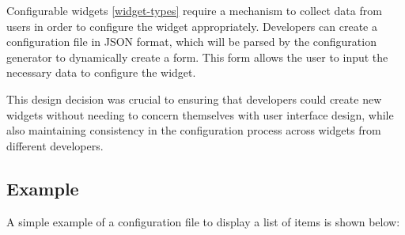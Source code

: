 Configurable widgets \ref{widget-types} require a mechanism to collect data from users in order to configure the widget appropriately. 
Developers can create a configuration file in JSON format, which will be parsed by the configuration generator to dynamically create a form. 
This form allows the user to input the necessary data to configure the widget.

This design decision was crucial to ensuring that developers could create new widgets without needing to concern themselves with user interface design, while also maintaining consistency in the configuration process across widgets from different developers.

\subsection{Example}

A simple example of a configuration file to display a list of items is shown below:

